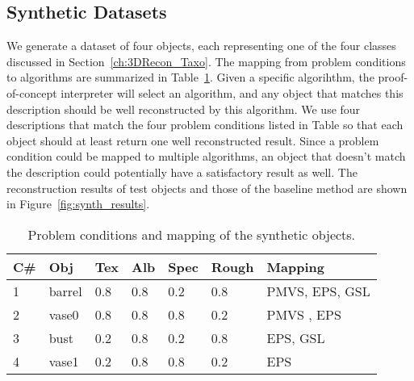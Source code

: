 \subsection{Synthetic Datasets}
We generate a dataset of four objects, each representing one of the four classes discussed in Section~\ref{ch:3DRecon_Taxo}. The mapping from problem conditions to algorithms are summarized in Table~\ref{tab:synth_prop_list}. Given a specific algorihthm, the proof-of-concept interpreter will select an algorithm, and any object that matches this description should be well reconstructed by this algorithm. We use four descriptions that match the four problem conditions listed in Table so that each object should at least return one well reconstructed result. Since a problem condition could be mapped to multiple algorithms, an object that doesn't match the description could potentially have a satisfactory result as well. The reconstruction results of test objects and those of the baseline method are shown in Figure~\ref{fig:synth_results}.
\begin{table}[!htbp]
  \centering
  \begin{tabular}{lllllll}
  \hline
  \textbf{C\#} & \textbf{Obj} & Tex & Alb & Spec & Rough & Mapping\\
  \hline
  1 & barrel & 0.8 & 0.8 & 0.2 & 0.8 & PMVS, EPS, GSL\\
  2 & vase0 & 0.8 & 0.8 & 0.8 & 0.2 & PMVS , EPS\\
  3 & bust & 0.2 & 0.8 & 0.2 & 0.8 & EPS, GSL\\
  4 & vase1 & 0.2 & 0.8 & 0.8 & 0.2 & EPS\\
  \hline
  \end{tabular}
  \caption{Problem conditions and mapping of the synthetic objects.}
  \label{tab:synth_prop_list}
\end{table}

